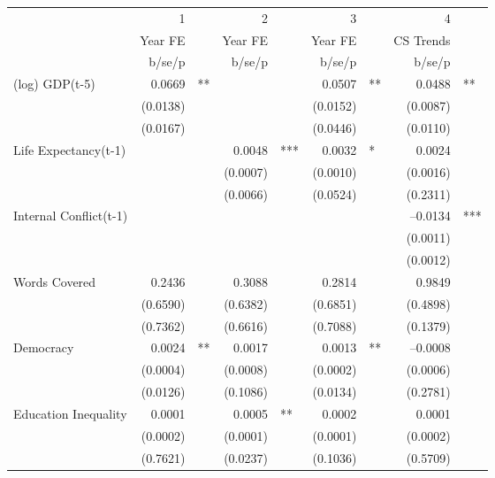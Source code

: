 \begin{tabular} {l* {4}{r @{} l}}
\hline
            &           1&   &           2&   &           3&   &           4&   \\
            &     Year FE&   &     Year FE&   &     Year FE&   &   CS Trends&   \\
            &      b/se/p&   &      b/se/p&   &      b/se/p&   &      b/se/p&   \\
\hline
(log) GDP(t-5)&      0.0669&** &            &   &      0.0507&** &      0.0488&** \\
            &    (0.0138)&   &            &   &    (0.0152)&   &    (0.0087)&   \\
            &    (0.0167)&   &            &   &    (0.0446)&   &    (0.0110)&   \\
Life Expectancy(t-1) &            &   &      0.0048&***&      0.0032&*  &      0.0024&   \\
            &            &   &    (0.0007)&   &    (0.0010)&   &    (0.0016)&   \\
            &            &   &    (0.0066)&   &    (0.0524)&   &    (0.2311)&   \\
Internal Conflict(t-1)&            &   &            &   &            &   &    --0.0134&***\\
            &            &   &            &   &            &   &    (0.0011)&   \\
            &            &   &            &   &            &   &    (0.0012)&   \\
Words Covered&      0.2436&   &      0.3088&   &      0.2814&   &      0.9849&   \\
            &    (0.6590)&   &    (0.6382)&   &    (0.6851)&   &    (0.4898)&   \\
            &    (0.7362)&   &    (0.6616)&   &    (0.7088)&   &    (0.1379)&   \\
Democracy   &      0.0024&** &      0.0017&   &      0.0013&** &    --0.0008&   \\
            &    (0.0004)&   &    (0.0008)&   &    (0.0002)&   &    (0.0006)&   \\
            &    (0.0126)&   &    (0.1086)&   &    (0.0134)&   &    (0.2781)&   \\
Education Inequality&      0.0001&   &      0.0005&** &      0.0002&   &      0.0001&   \\
            &    (0.0002)&   &    (0.0001)&   &    (0.0001)&   &    (0.0002)&   \\
            &    (0.7621)&   &    (0.0237)&   &    (0.1036)&   &    (0.5709)&   \\

\end{tabular}
